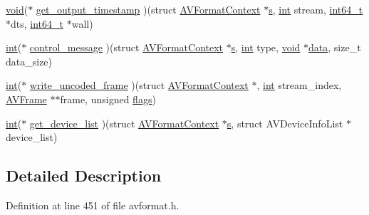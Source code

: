 \begin{DoxyCompactItemize}
\item 
\hyperlink{sound_8c_ae35f5844602719cf66324f4de2a658b3}{void}($\ast$ \hyperlink{struct_a_v_output_format_a605bb6484d5da9f0ea9b129d438e353d}{get\+\_\+output\+\_\+timestamp} )(struct \hyperlink{struct_a_v_format_context}{A\+V\+Format\+Context} $\ast$\hyperlink{lib_2expat_8h_a755339d27872b13735c2cab829e47157}{s}, \hyperlink{xmltok_8h_a5a0d4a5641ce434f1d23533f2b2e6653}{int} stream, \hyperlink{lib-src_2ffmpeg_2win32_2stdint_8h_a67a9885ef4908cb72ce26d75b694386c}{int64\+\_\+t} $\ast$dts, \hyperlink{lib-src_2ffmpeg_2win32_2stdint_8h_a67a9885ef4908cb72ce26d75b694386c}{int64\+\_\+t} $\ast$wall)
\item 
\hyperlink{xmltok_8h_a5a0d4a5641ce434f1d23533f2b2e6653}{int}($\ast$ \hyperlink{struct_a_v_output_format_aaf8c014593bd71d0bb5f542267a02a90}{control\+\_\+message} )(struct \hyperlink{struct_a_v_format_context}{A\+V\+Format\+Context} $\ast$\hyperlink{lib_2expat_8h_a755339d27872b13735c2cab829e47157}{s}, \hyperlink{xmltok_8h_a5a0d4a5641ce434f1d23533f2b2e6653}{int} type, \hyperlink{sound_8c_ae35f5844602719cf66324f4de2a658b3}{void} $\ast$\hyperlink{lib_2expat_8h_ac39e72a1de1cb50dbdc54b08d0432a24}{data}, size\+\_\+t data\+\_\+size)
\item 
\hyperlink{xmltok_8h_a5a0d4a5641ce434f1d23533f2b2e6653}{int}($\ast$ \hyperlink{struct_a_v_output_format_a6c35fd05fb664e4950de2173bbeda793}{write\+\_\+uncoded\+\_\+frame} )(struct \hyperlink{struct_a_v_format_context}{A\+V\+Format\+Context} $\ast$, \hyperlink{xmltok_8h_a5a0d4a5641ce434f1d23533f2b2e6653}{int} stream\+\_\+index, \hyperlink{struct_a_v_frame}{A\+V\+Frame} $\ast$$\ast$frame, unsigned \hyperlink{struct_a_v_output_format_aad55a00e728a020c1dcfaaf695320445}{flags})
\item 
\hyperlink{xmltok_8h_a5a0d4a5641ce434f1d23533f2b2e6653}{int}($\ast$ \hyperlink{struct_a_v_output_format_adb9c784dcf21e76db0b18c9d019cb723}{get\+\_\+device\+\_\+list} )(struct \hyperlink{struct_a_v_format_context}{A\+V\+Format\+Context} $\ast$\hyperlink{lib_2expat_8h_a755339d27872b13735c2cab829e47157}{s}, struct A\+V\+Device\+Info\+List $\ast$device\+\_\+list)
\end{DoxyCompactItemize}


\subsection{Detailed Description}


Definition at line 451 of file avformat.\+h.



